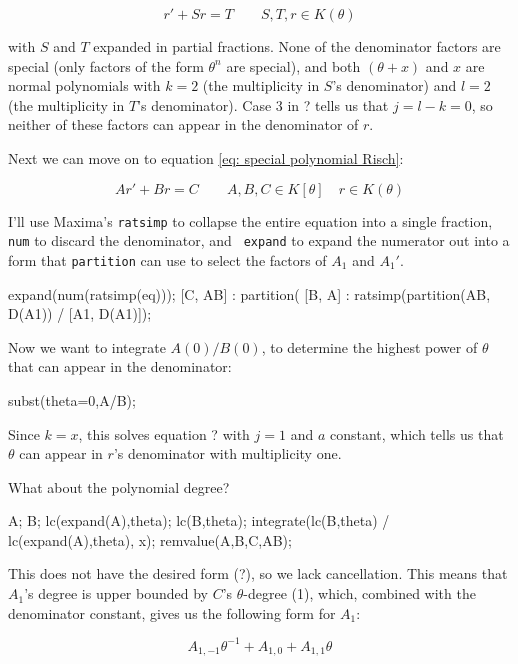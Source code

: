 $$r' + S r = T \qquad S,T,r \in K(\theta)$$

with $S$ and $T$ expanded in partial fractions.  None of the
denominator factors are special (only factors of the form $\theta^n$
are special), and both $(\theta+x)$ and $x$ are normal polynomials
with $k=2$ (the multiplicity in $S$'s denominator) and $l=2$
(the multiplicity in $T$'s denominator).  Case 3 in ? tells us
that $j=l-k=0$, so neither of these factors can appear
in the denominator of $r$.

Next we can move on to equation \ref{eq: special polynomial Risch}:

\begin{equation*}
A r' + B r = C \qquad A,B,C \in K[\theta] \quad r \in K(\theta)
\end{equation*}

I'll use Maxima's {\tt ratsimp} to collapse the entire equation into a
single fraction, {\tt num} to discard the denominator, and {\tt
expand} to expand the numerator out into a form that {\tt partition}
can use to select the factors of $A_1$ and $A_1'$.

\begin{maximablock}
expand(num(ratsimp(eq)));
[C, AB] : partition(%
[B, A] : ratsimp(partition(AB, D(A1))
          / [A1, D(A1)]);
\end{maximablock}

Now we want to integrate $A(0)/B(0)$, to determine the highest power
of $\theta$ that can appear in the denominator:

\begin{maximablock}
subst(theta=0,A/B);
\end{maximablock}

Since $k=x$, this solves equation ? with $j=1$ and $a$ constant,
which tells us that $\theta$ can appear in $r$'s denominator
with multiplicity one.

What about the polynomial degree?

\begin{maximablock}
A;
B;
lc(expand(A),theta);
lc(B,theta);
integrate(lc(B,theta) / lc(expand(A),theta), x);
remvalue(A,B,C,AB);
\end{maximablock}

This does not have the desired form (?), so we lack cancellation.
This means that $A_1$'s degree is upper bounded by
$C$'s $\theta$-degree (1), which, combined with the denominator constant,
gives us the following form for $A_1$:

$$A_{1,-1} \theta^{-1} + A_{1,0} + A_{1,1} \theta$$

